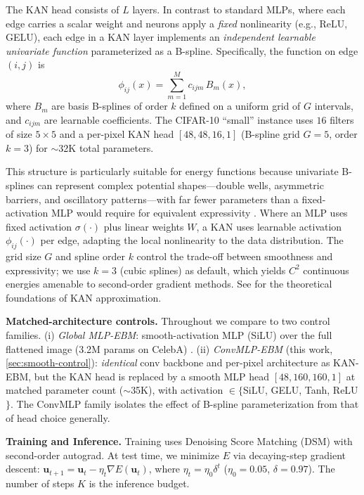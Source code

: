 \documentclass{article}
\newcommand{\uu}{\mathbf{u}}
\begin{document}
The KAN head consists of $L$ layers. In contrast to standard MLPs, where each edge carries a scalar weight and neurons apply a \emph{fixed} nonlinearity (e.g., ReLU, GELU), each edge in a KAN layer implements an \emph{independent learnable univariate function} parameterized as a B-spline. Specifically, the function on edge $(i,j)$ is
\begin{equation}
    \phi_{ij}(x) = \sum_{m=1}^{M} c_{ijm} \, B_m(x),
\end{equation}
where $B_m$ are basis B-splines of order $k$ defined on a uniform grid of $G$ intervals, and $c_{ijm}$ are learnable coefficients. The CIFAR-10 ``small'' instance uses $16$ filters of size $5{\times}5$ and a per-pixel KAN head $[48, 48, 16, 1]$ (B-spline grid $G{=}5$, order $k{=}3$) for $\sim$32K total parameters.

This structure is particularly suitable for energy functions because univariate B-splines can represent complex potential shapes---double wells, asymmetric barriers, and oscillatory patterns---with far fewer parameters than a fixed-activation MLP would require for equivalent expressivity \citep{deboor1978splines, liu2024kan}. Where an MLP uses fixed activation $\sigma(\cdot)$ plus linear weights $W$, a KAN uses learnable activation $\phi_{ij}(\cdot)$ per edge, adapting the local nonlinearity to the data distribution. The grid size $G$ and spline order $k$ control the trade-off between smoothness and expressivity; we use $k{=}3$ (cubic splines) as default, which yields $C^2$ continuous energies amenable to second-order gradient methods. See \citet{liu2024kan} for the theoretical foundations of KAN approximation.

\textbf{Matched-architecture controls.} Throughout we compare to two control families. (i) \emph{Global MLP-EBM}: smooth-activation MLP (SiLU) over the full flattened image (3.2M params on CelebA) \citep{du2019implicit}. (ii) \emph{ConvMLP-EBM} (this work, \cref{sec:smooth-control}): \emph{identical} conv backbone and per-pixel architecture as KAN-EBM, but the KAN head is replaced by a smooth MLP head $[48, 160, 160, 1]$ at matched parameter count ($\sim$35K), with activation $\in \{$SiLU, GELU, Tanh, ReLU$\}$. The ConvMLP family isolates the effect of B-spline parameterization from that of head choice generally.

\textbf{Training and Inference.} Training uses Denoising Score Matching (DSM) \citep{vincent2011dsm} with second-order autograd. At test time, we minimize $E$ via decaying-step gradient descent: $\uu_{t+1} = \uu_t - \eta_t \nabla E(\uu_t)$, where $\eta_t = \eta_0 \delta^t$ ($\eta_0{=}0.05$, $\delta{=}0.97$). The number of steps $K$ is the inference budget.
\end{document}

